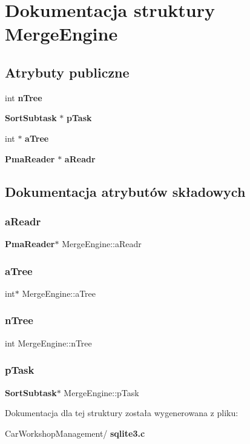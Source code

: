 \section{Dokumentacja struktury Merge\+Engine}
\label{struct_merge_engine}
\subsection*{Atrybuty publiczne}
\begin{DoxyCompactItemize}
\item 
int \textbf{ n\+Tree}
\item 
\textbf{ Sort\+Subtask} $\ast$ \textbf{ p\+Task}
\item 
int $\ast$ \textbf{ a\+Tree}
\item 
\textbf{ Pma\+Reader} $\ast$ \textbf{ a\+Readr}
\end{DoxyCompactItemize}


\subsection{Dokumentacja atrybutów składowych}
\mbox{\label{struct_merge_engine_a897688db3212c8b3049a57cda6f2f975}} 
\subsubsection{aReadr}
{\footnotesize\ttfamily \textbf{ Pma\+Reader}$\ast$ Merge\+Engine\+::a\+Readr}

\mbox{\label{struct_merge_engine_aac39bb928db1c72c48db263e0937b285}} 
\subsubsection{aTree}
{\footnotesize\ttfamily int$\ast$ Merge\+Engine\+::a\+Tree}

\mbox{\label{struct_merge_engine_a48d8ad99ae5063e96458b5563ff2bbd3}} 
\subsubsection{nTree}
{\footnotesize\ttfamily int Merge\+Engine\+::n\+Tree}

\mbox{\label{struct_merge_engine_a0a366796f579aa7befcb2683ff767c0d}} 
\subsubsection{pTask}
{\footnotesize\ttfamily \textbf{ Sort\+Subtask}$\ast$ Merge\+Engine\+::p\+Task}



Dokumentacja dla tej struktury została wygenerowana z pliku\+:\begin{DoxyCompactItemize}
\item 
Car\+Workshop\+Management/\textbf{ sqlite3.\+c}\end{DoxyCompactItemize}
